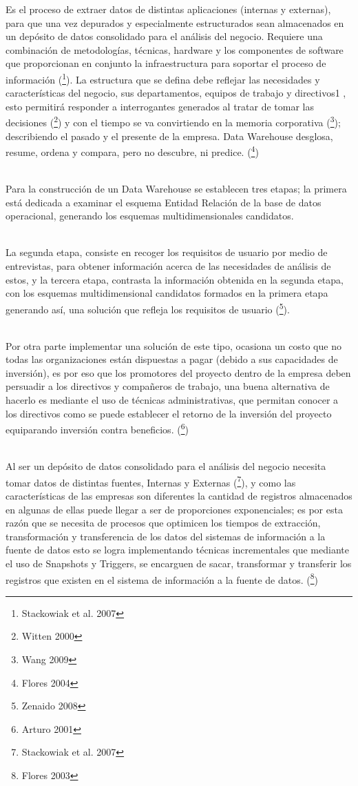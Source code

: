 \documentclass[a4paper,12pt,twocolumn]{article}
\begin{document}
Es el proceso de extraer datos de distintas aplicaciones (internas y externas), para que una vez depurados y especialmente estructurados sean almacenados en un depósito de datos consolidado para el análisis del negocio. Requiere una combinación de metodologías, técnicas, hardware y los componentes de software que proporcionan en conjunto la infraestructura para soportar el proceso de información (\footnote{Stackowiak et al. 2007}). La estructura que se defina debe reflejar las necesidades y características del negocio, sus departamentos, equipos de trabajo y directivos1 , esto permitirá responder a interrogantes generados al tratar de tomar las decisiones (\footnote{Witten 2000}) y con el tiempo se va convirtiendo en la memoria corporativa (\footnote{Wang 2009}); describiendo el pasado y el presente de la empresa. Data Warehouse desglosa, resume, ordena y compara, pero no descubre, ni predice. (\footnote{Flores 2004}) 

\textbf{}\\
Para la construcción de un Data Warehouse se establecen tres etapas; la primera está dedicada a examinar el esquema Entidad Relación de la base de datos operacional, generando los esquemas multidimensionales candidatos. 

\textbf{}\\
La segunda etapa, consiste en recoger los requisitos de usuario por medio de entrevistas, para obtener información acerca de las necesidades de análisis de estos, y la tercera etapa, contrasta la información obtenida en la segunda etapa, con los esquemas multidimensional candidatos formados en la primera etapa generando así, una solución que refleja los requisitos de usuario (\footnote{Zenaido 2008}). 

\textbf{}\\
Por otra parte implementar una solución de este tipo, ocasiona un costo que no todas las organizaciones están dispuestas a pagar (debido a sus capacidades de inversión), es por eso que los promotores del proyecto dentro de la empresa deben persuadir a los directivos y compañeros de trabajo, una buena alternativa de hacerlo es mediante el uso de técnicas administrativas, que permitan conocer a los directivos como se puede establecer el retorno de la inversión del proyecto equiparando inversión contra beneficios.  (\footnote{Arturo 2001})

\textbf{}\\
Al ser un depósito de datos consolidado para el análisis del negocio necesita tomar datos de distintas fuentes, Internas y Externas (\footnote{Stackowiak et al. 2007}), y como las características de las empresas son diferentes la cantidad de registros almacenados en algunas de ellas puede llegar a ser de proporciones exponenciales; es por esta razón que se necesita de procesos que optimicen los tiempos de extracción, transformación y transferencia de los datos del sistemas de información a la fuente de datos esto se logra implementando técnicas incrementales que mediante el uso de Snapshots y Triggers, se encarguen de sacar, transformar y transferir los registros que existen en el sistema de información a la fuente de datos. (\footnote{Flores 2003})
\textbf{}\\
\end{document}
